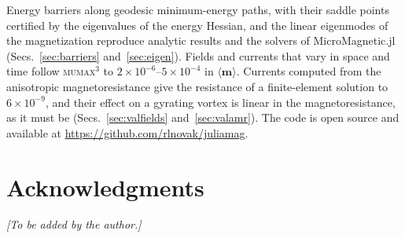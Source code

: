 \documentclass{article}      %
\newcommand{\mumax}{\textsc{mumax}$^3$}
\newcommand{\vm}{\bm{m}}
\begin{document}
Energy barriers along geodesic minimum-energy paths, with their saddle points certified by
the eigenvalues of the energy Hessian, and the linear eigenmodes of the magnetization reproduce
analytic results and the solvers of MicroMagnetic.jl (Secs.~\ref{sec:barriers}
and~\ref{sec:eigen}). Fields and currents that vary in space and time follow
\mumax{} to $2\times10^{-6}$--$5\times10^{-4}$ in $\langle\vm\rangle$. Currents computed from the
anisotropic magnetoresistance give the resistance of a finite-element solution to
$6\times10^{-9}$, and their effect on a gyrating vortex is linear in the
magnetoresistance, as it must be (Secs.~\ref{sec:valfields} and~\ref{sec:valamr}).
The code is open source and available at
\url{https://github.com/rlnovak/juliamag}.

\section*{Acknowledgments}
\emph{[To be added by the author.]}
\end{document}
